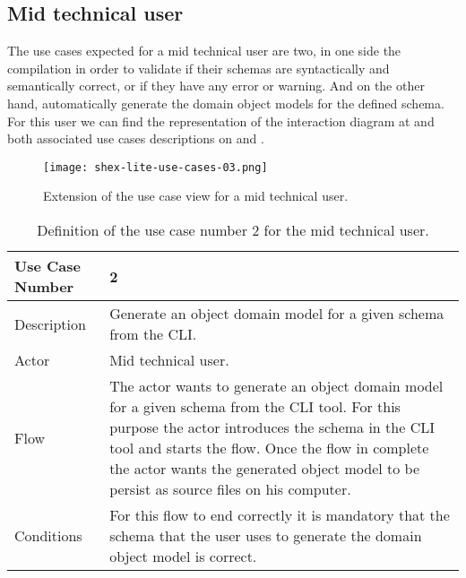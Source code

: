 \subsection{Mid technical user}
The use cases expected for a mid technical user are two, in one side the compilation in order to validate if their schemas are syntactically and semantically correct, or if they have any error or warning. And on the other hand, automatically generate the domain object models for the defined schema. For this user we can find the representation of the interaction diagram at  and both associated use cases descriptions on  and .

\begin{figure}[hb]
    \texttt{[image: shex-lite-use-cases-03.png]}
    \caption[Extension of the use case view for a mid technical user]{Extension of the use case view for a mid technical user.}
\end{figure}

\begin{table}
    \begin{tabular}{ | m{2cm} | m{8cm}| }
        \toprule
        Use Case Number & 2 \\
        \midrule
        Description & Generate an object domain model for a given schema from the CLI. \\
        \midrule
        Actor & Mid technical user. \\
        \midrule
        Flow & The actor wants to generate an object domain model for a given schema from the CLI tool. For this purpose the actor introduces the schema in the CLI tool and starts the flow. Once the flow in complete the actor wants the generated object model to be persist as source files on his computer. \\
        Conditions & For this flow to end correctly it is mandatory that the schema that the user uses to generate the domain object model is correct. \\
        \bottomrule
    \end{tabular}
    \caption[Definition of the use case number 2 for the mid technical user]{Definition of the use case number 2 for the mid technical user.}
\end{table}

